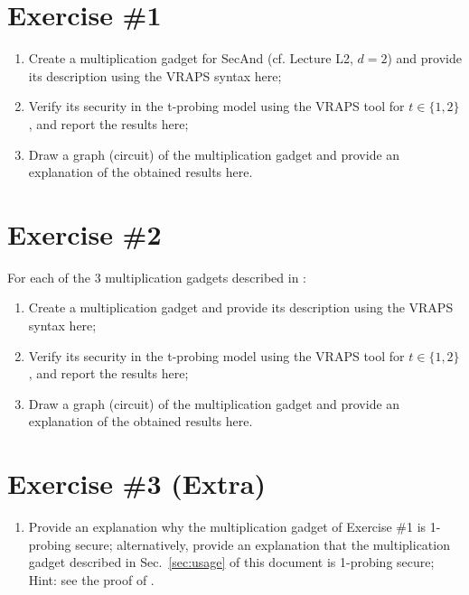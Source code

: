 \documentclass{article}
\begin{document}
\section{Exercise \#1}

\begin{enumerate}
  \item Create a multiplication gadget for SecAnd (cf. Lecture L2, $d=2$) and provide its description using the VRAPS syntax here;
  \item Verify its security in the t-probing model using the VRAPS tool for $t\in\{1,2\}$, and report the results here;
  \item Draw a graph (circuit) of the multiplication gadget and provide an explanation of the obtained results here.
\end{enumerate}

\section{Exercise \#2}

For each of the 3 multiplication gadgets described in \cite[Sec.3, p.11]{DBLP:conf/crypto/BelaidCPRT20}:
\begin{enumerate}
  \item Create a multiplication gadget and provide its description using the VRAPS syntax here;
  \item Verify its security in the t-probing model using the VRAPS tool for $t\in\{1,2\}$, and report the results here;
  \item Draw a graph (circuit) of the multiplication gadget and provide an explanation of the obtained results here.
\end{enumerate}

\section{Exercise \#3 (Extra)}
\begin{enumerate}
  \item Provide an explanation why the multiplication gadget of Exercise \#1 is 1-probing secure; alternatively, provide an explanation that
the multiplication gadget described in Sec.~\ref{sec:usage} of this document is 1-probing secure; Hint: see the proof of \cite[Th.
1]{DBLP:conf/crypto/IshaiSW03}.
\end{enumerate}

\printbibliography
\end{document}
